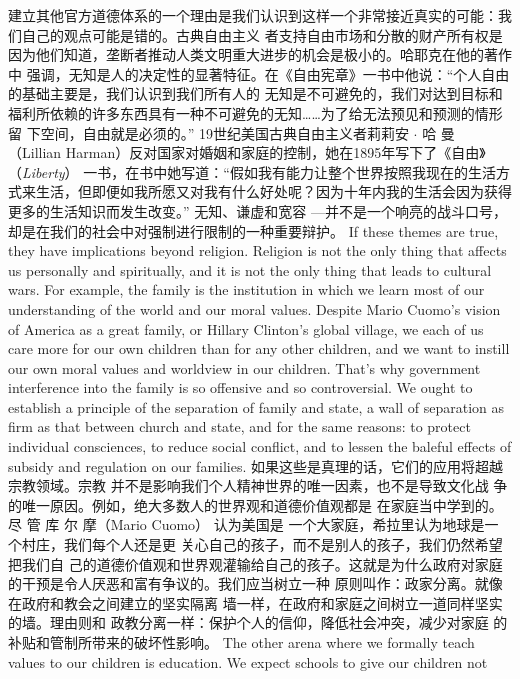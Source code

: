 \begin{paracol}{2}
建立其他官方道德体系的一个理由是我们认识到这样一个非常接近真实的可能：我们自己的观点可能是错的。古典自由主义
者支持自由市场和分散的财产所有权是因为他们知道，垄断者推动人类文明重大进步的机会是极小的。哈耶克在他的著作中
强调，无知是人的决定性的显著特征。在《自由宪章》一书中他说：“个人自由的基础主要是，我们认识到我们所有人的
无知是不可避免的，我们对达到目标和福利所依赖的许多东西具有一种不可避免的无知……为了给无法预见和预测的情形留
下空间，自由就是必须的。” 19世纪美国古典自由主义者莉莉安 $\cdot$ 哈 曼 （Lillian  Harman）反对国家对婚姻和家庭的控制，她在1895年写下了《自由》（\textit{Liberty}） 一书，在书中她写道：“假如我有能力让整个世界按照我现在的生活方式来生活，但即便如我所愿又对我有什么好处呢？因为十年内我的生活会因为获得更多的生活知识而发生改变。” 无知、谦虚和宽容 ---并不是一个响亮的战斗口号，却是在我们的社会中对强制进行限制的一种重要辩护。
\switchcolumn*
If these themes are true, they have implications beyond religion. Religion is not the only thing that affects us personally
and spiritually, and it is not the only thing that leads to cultural wars. For example, the family is the institution in which
we learn most of our understanding of the world and our moral
values. Despite Mario Cuomo's vision of America as a great
family, or Hillary Clinton's global village, we each of us care
more for our own children than for any other children, and we
want to instill our own moral values and worldview in our children. That's why government interference into the family is so
offensive and so controversial. We ought to establish a principle of the separation of family and state, a wall of separation as
firm as that between church and state, and for the same reasons: to protect individual consciences, to reduce social conflict, and to lessen the baleful effects of subsidy and regulation
on our families.
\switchcolumn
如果这些是真理的话，它们的应用将超越宗教领域。宗教
并不是影响我们个人精神世界的唯一因素，也不是导致文化战
争的唯一原因。例如，绝大多数人的世界观和道德价值观都是
在家庭当中学到的。尽 管 库 尔 摩（Mario Cuomo） 认为美国是
一个大家庭，希拉里认为地球是一个村庄，我们每个人还是更
关心自己的孩子，而不是别人的孩子，我们仍然希望把我们自
己的道德价值观和世界观灌输给自己的孩子。这就是为什么政府对家庭的干预是令人厌恶和富有争议的。我们应当树立一种
原则叫作：政家分离。就像在政府和教会之间建立的坚实隔离
墙一样，在政府和家庭之间树立一道同样坚实的墙。理由则和
政教分离一样：保护个人的信仰，降低社会冲突，减少对家庭
的补贴和管制所带来的破坏性影响。
\switchcolumn*
The other arena where we formally teach values to our children is education. We expect schools to give our children not

\end{paracol}
